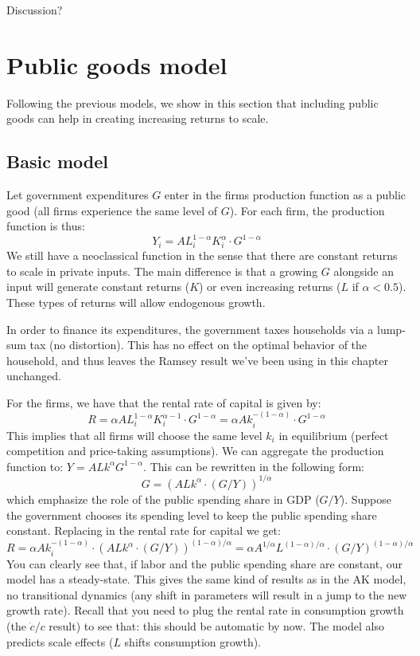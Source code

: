 \documentclass[12pt]{report}
\begin{document}
Discussion?

\section{Public goods model}

Following the previous models, we show in this section that including public goods can help in creating increasing returns to scale.

\subsection{Basic model}

Let government expenditures $G$ enter in the firms production function as a public good (all firms experience the same level of $G$). For each firm, the production function is thus: $$ Y_i = AL_i^{1-\alpha}K_i^{\alpha}\cdot G^{1-\alpha} $$ We still have a neoclassical function in the sense that there are constant returns to scale in private inputs. The main difference is that a growing $G$ alongside an input will generate constant returns ($K$) or even increasing returns ($L$ if $\alpha < 0.5$). These types of returns will allow endogenous growth.

In order to finance its expenditures, the government taxes households via a lump-sum tax (no distortion). This has no effect on the optimal behavior of the household, and thus leaves the Ramsey result we've been using in this chapter unchanged.

For the firms, we have that the rental rate of capital is given by: $$R = \alpha A L_i^{1 - \alpha} K_i^{\alpha - 1} \cdot G^{1-\alpha} = \alpha A  k_i^{-(1 - \alpha)} \cdot G^{1-\alpha} $$ This implies that all firms will choose the same level $k_i$ in equilibrium (perfect competition and price-taking assumptions). We can aggregate the production function to: $Y = ALk^\alpha G^{1-\alpha} $. This can be rewritten in the following form: $$ G = \left( ALk^{\alpha}\cdot (G/Y) \right)^{1/\alpha} $$ which emphasize the role of the public spending share in GDP ($G/Y$). Suppose the government chooses its spending level to keep the public spending share constant. Replacing in the rental rate for capital we get: $$R = \alpha A  k_i^{-(1 - \alpha)} \cdot \left( ALk^{\alpha}\cdot(G/Y)\right)^{(1-\alpha)/\alpha} = \alpha A^{1/\alpha}L^{(1-\alpha)/\alpha} \cdot (G/Y)^{(1-\alpha)/\alpha} $$ 
You can clearly see that, if labor and the public spending share are constant, our model has a steady-state. This gives the same kind of results as in the AK model, no transitional dynamics (any shift in parameters will result in a jump to the new growth rate). Recall that you need to plug the rental rate in consumption growth (the $\dot c/c$ result) to see that: this should be automatic by now. The model also predicts scale effects ($L$ shifts consumption growth).
\end{document}
